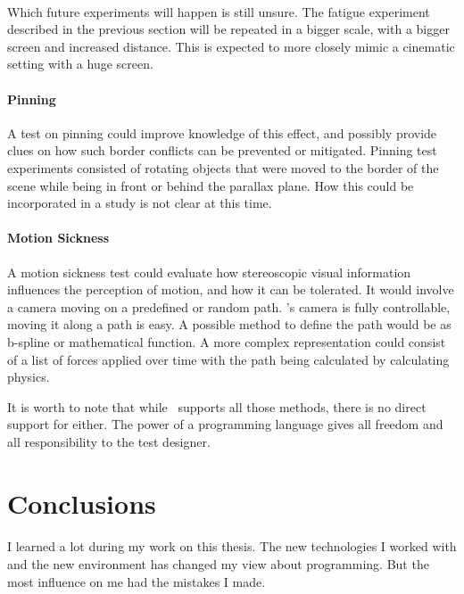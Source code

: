 \paragraph{}
Which future experiments will happen is still unsure.
The fatigue experiment described in the previous section will be repeated in a bigger scale, with a bigger screen and increased distance.
This is expected to more closely mimic a cinematic setting with a huge screen.

\paragraph{Pinning}
A test on pinning could improve knowledge of this effect, and possibly provide clues on how such border conflicts can be prevented or mitigated.
Pinning test experiments consisted of rotating objects that were moved to the border of the scene while being in front or behind the parallax plane.
How this could be incorporated in a study is not clear at this time.

\paragraph{Motion Sickness}
A motion sickness test could evaluate how stereoscopic visual information influences the perception of motion, and how it can be tolerated.
It would involve a camera moving on a predefined or random path.
\ER's camera is fully controllable, moving it along a path is easy.
A possible method to define the path would be as b-spline or mathematical function.
A more complex representation could consist of a list of forces applied over time with the path being calculated by calculating physics.

It is worth to note that while \ER\ supports all those methods, there is no direct support for either.
The power of a programming language gives all freedom and all responsibility to the test designer.


\section{Conclusions}
\paragraph{}
I learned a lot during my work on this thesis.
The new technologies I worked with and the new environment has changed my view about programming.
But the most influence on me had the mistakes I made.

